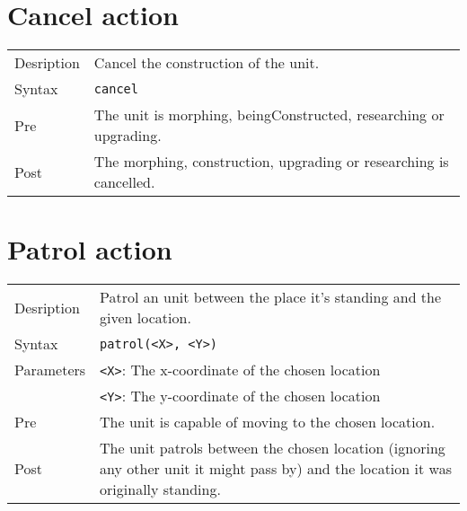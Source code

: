 \section{Cancel action}
\begin{tabularx}{\textwidth}{lX}
 Desription & Cancel the construction of the unit. \\
 Syntax & \verb|cancel| \\
 Pre & The unit is morphing, beingConstructed, researching or upgrading. \\
 Post & The morphing, construction, upgrading or researching is cancelled.
\end{tabularx}

\section{Patrol action}
\begin{tabularx}{\textwidth}{lX}
 Desription & Patrol an unit between the place it's standing and the given location. \\
 Syntax & \verb|patrol(<X>, <Y>)| \\
 Parameters & \verb|<X>|: The x-coordinate of the chosen location \\
            &  \verb|<Y>|: The y-coordinate of the chosen location \\
 Pre & The unit is capable of moving to the chosen location. \\
 Post & The unit patrols between the chosen location (ignoring any other unit it might pass by) and the location it was originally standing.
\end{tabularx}

